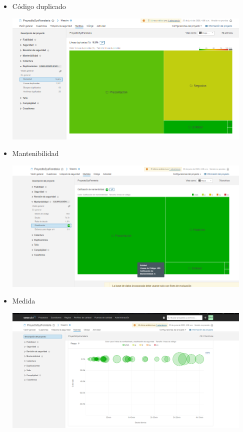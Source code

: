 \documentclass[preprint,12pt]{elsarticle}
\begin{document}
	\begin{itemize}
	    \item Código duplicado
	\begin{center}
	\includegraphics[width=12cm]{./imagen/8} 
	\end{center}
	\item Mantenibilidad
	\begin{center}
	\includegraphics[width=12cm]{./imagen/9} 
	\end{center}
	\item Medida
		\begin{center}
	\includegraphics[width=12cm]{./imagen/10} 
	\end{center}
	\end{itemize}
\end{document}
